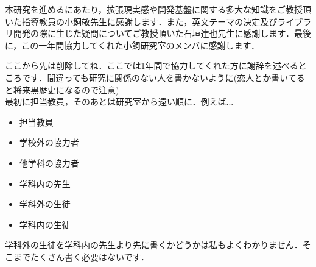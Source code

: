 本研究を進めるにあたり，拡張現実感や開発基盤に関する多大な知識をご教授頂いた指導教員の小飼敬先生に感謝します．また，英文テーマの決定及びライブラリ開発の際に生じた疑問についてご教授頂いた石垣達也先生に感謝します．最後に，この一年間協力してくれた小飼研究室のメンバに感謝します．
\par \vspace{5pt}
ここから先は削除してね．ここでは1年間で協力してくれた方に謝辞を述べるところです．間違っても研究に関係のない人を書かないように(恋人とか書いてると将来黒歴史になるので注意)\\
最初に担当教員，そのあとは研究室から遠い順に．例えば...\\

\begin{itemize}
 \item 担当教員
 \item 学校外の協力者
 \item 他学科の協力者
 \item 学科内の先生
 \item 学科外の生徒
 \item 学科内の生徒
\end{itemize}

学科外の生徒を学科内の先生より先に書くかどうかは私もよくわかりません．そこまでたくさん書く必要はないです．